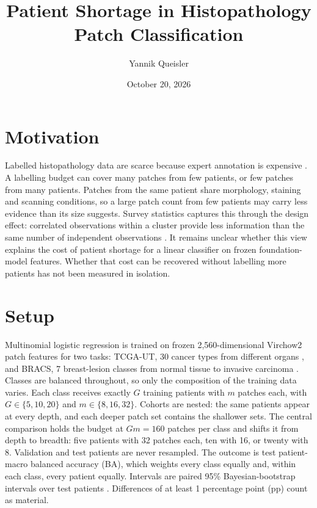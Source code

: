\documentclass[11pt]{article}
\title{\vspace{-1cm}\LARGE Patient Shortage in Histopathology Patch Classification\vspace{-0.5em}}
\author{Yannik Queisler}
\date{October 20, 2026}
\begin{document}
\maketitle

\section{Motivation}
Labelled histopathology data are scarce because expert annotation is expensive \citep{lu2021dataEfficient}. A labelling budget can cover many patches from few patients, or few patches from many patients. Patches from the same patient share morphology, staining and scanning conditions, so a large patch count from few patients may carry less evidence than its size suggests. Survey statistics captures this through the design effect: correlated observations within a cluster provide less information than the same number of independent observations \citep{kish1965survey}. It remains unclear whether this view explains the cost of patient shortage for a linear classifier on frozen foundation-model features. Whether that cost can be recovered without labelling more patients has not been measured in isolation.

\section{Setup}
Multinomial logistic regression is trained on frozen 2,560-dimensional Virchow2 patch features \citep{zimmermann2024virchow2} for two tasks: TCGA-UT, 30 cancer types from different organs \citep{komura2022universalEncoding}, and BRACS, 7 breast-lesion classes from normal tissue to invasive carcinoma \citep{brancati2022bracs}. Classes are balanced throughout, so only the composition of the training data varies. Each class receives exactly $G$ training patients with $m$ patches each, with $G\in\{5,10,20\}$ and $m\in\{8,16,32\}$. Cohorts are nested: the same patients appear at every depth, and each deeper patch set contains the shallower sets. The central comparison holds the budget at $Gm=160$ patches per class and shifts it from depth to breadth: five patients with 32 patches each, ten with 16, or twenty with 8. Validation and test patients are never resampled. The outcome is test patient-macro balanced accuracy (BA), which weights every class equally and, within each class, every patient equally. Intervals are paired 95\% Bayesian-bootstrap intervals over test patients \citep{rubin1981bayesian}. Differences of at least 1 percentage point (pp) count as material.
\end{document}
